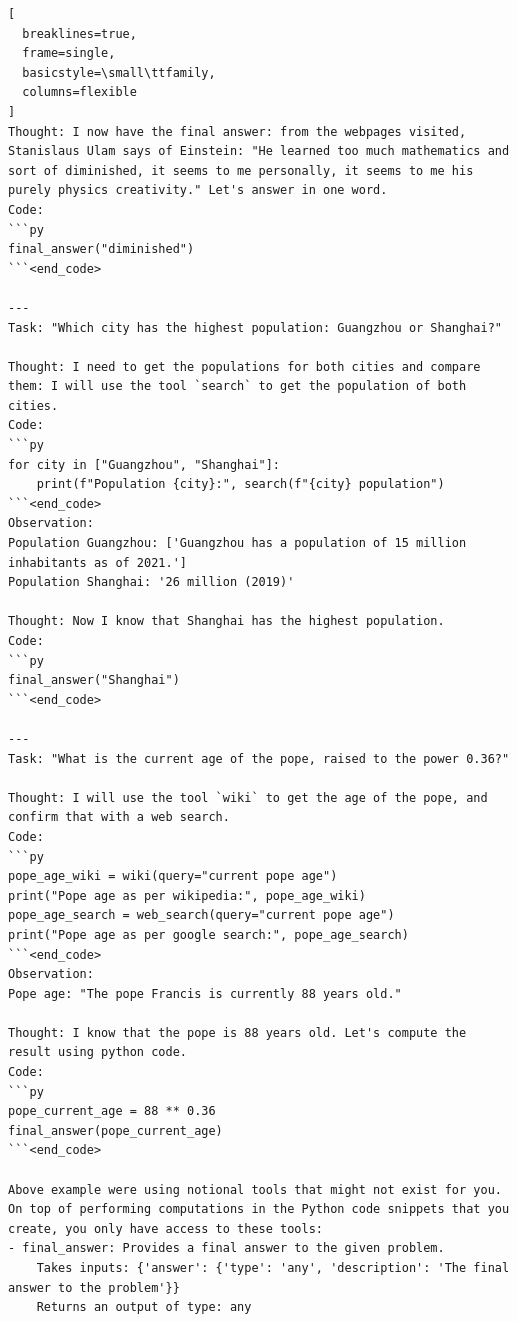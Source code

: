 \documentclass[11pt]{article}
\begin{document}
\begin{lstlisting}[
  breaklines=true,
  frame=single,
  basicstyle=\small\ttfamily,
  columns=flexible
]
Thought: I now have the final answer: from the webpages visited, Stanislaus Ulam says of Einstein: "He learned too much mathematics and sort of diminished, it seems to me personally, it seems to me his purely physics creativity." Let's answer in one word.
Code:
```py
final_answer("diminished")
```<end_code>

---
Task: "Which city has the highest population: Guangzhou or Shanghai?"

Thought: I need to get the populations for both cities and compare them: I will use the tool `search` to get the population of both cities.
Code:
```py
for city in ["Guangzhou", "Shanghai"]:
    print(f"Population {city}:", search(f"{city} population")
```<end_code>
Observation:
Population Guangzhou: ['Guangzhou has a population of 15 million inhabitants as of 2021.']
Population Shanghai: '26 million (2019)'

Thought: Now I know that Shanghai has the highest population.
Code:
```py
final_answer("Shanghai")
```<end_code>

---
Task: "What is the current age of the pope, raised to the power 0.36?"

Thought: I will use the tool `wiki` to get the age of the pope, and confirm that with a web search.
Code:
```py
pope_age_wiki = wiki(query="current pope age")
print("Pope age as per wikipedia:", pope_age_wiki)
pope_age_search = web_search(query="current pope age")
print("Pope age as per google search:", pope_age_search)
```<end_code>
Observation:
Pope age: "The pope Francis is currently 88 years old."

Thought: I know that the pope is 88 years old. Let's compute the result using python code.
Code:
```py
pope_current_age = 88 ** 0.36
final_answer(pope_current_age)
```<end_code>

Above example were using notional tools that might not exist for you. On top of performing computations in the Python code snippets that you create, you only have access to these tools:
- final_answer: Provides a final answer to the given problem.
    Takes inputs: {'answer': {'type': 'any', 'description': 'The final answer to the problem'}}
    Returns an output of type: any


\end{lstlisting}
\end{document}
